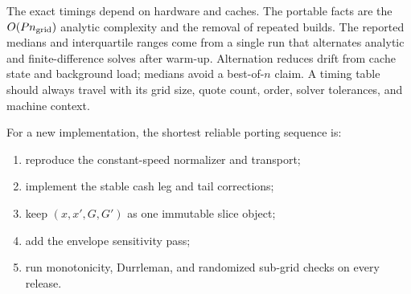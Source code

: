 The exact timings depend on hardware and caches.  The portable facts are the
$O(Pn_{\rm grid})$ analytic complexity and the removal of repeated builds.
The reported medians and interquartile ranges come from a single run that
alternates analytic and finite-difference solves after warm-up.  Alternation
reduces drift from cache state and background load; medians avoid a
best-of-$n$ claim.  A timing table should always travel with its grid size,
quote count, order, solver tolerances, and machine context.

For a new implementation, the shortest reliable porting sequence is:
\begin{enumerate}
\item reproduce the constant-speed normalizer and transport;
\item implement the stable cash leg and tail corrections;
\item keep $(x,x',G,G')$ as one immutable slice object;
\item add the envelope sensitivity pass;
\item run monotonicity, Durrleman, and randomized sub-grid checks on every
release.
\end{enumerate}
